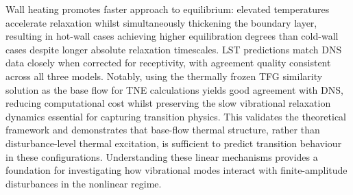 Wall heating promotes faster approach to equilibrium: elevated temperatures accelerate relaxation whilst simultaneously thickening the boundary layer, resulting in hot-wall cases achieving higher equilibration degrees than cold-wall cases despite longer absolute relaxation timescales. \gls{LST} predictions match \gls{DNS} data closely when corrected for receptivity, with agreement quality consistent across all three models. Notably, using the thermally frozen \gls{TFG} similarity solution as the base flow for \gls{TNE} calculations yields good agreement with \gls{DNS}, reducing computational cost whilst preserving the slow vibrational relaxation dynamics essential for capturing transition physics. This validates the theoretical framework and demonstrates that base-flow thermal structure, rather than disturbance-level thermal excitation, is sufficient to predict transition behaviour in these configurations. Understanding these linear mechanisms provides a foundation for investigating how vibrational modes interact with finite-amplitude disturbances in the nonlinear regime.



